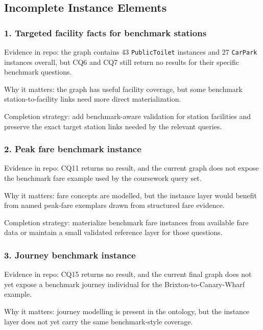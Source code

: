 \documentclass[
  11pt,
  a4paper,
]{article}
\begin{document}
\subsection{Incomplete Instance
Elements}\label{incomplete-instance-elements}

\subsubsection{1. Targeted facility facts for benchmark
stations}\label{1-targeted-facility-facts-for-benchmark-stations}

Evidence in repo: the graph contains 43 \texttt{PublicToilet} instances
and 27 \texttt{CarPark} instances overall, but CQ6 and CQ7 still return
no results for their specific benchmark questions.

Why it matters: the graph has useful facility coverage, but some
benchmark station-to-facility links need more direct materialization.

Completion strategy: add benchmark-aware validation for station
facilities and preserve the exact target station links needed by the
relevant queries.

\subsubsection{2. Peak fare benchmark
instance}\label{2-peak-fare-benchmark-instance}

Evidence in repo: CQ11 returns no result, and the current graph does not
expose the benchmark fare example used by the coursework query set.

Why it matters: fare concepts are modelled, but the instance layer would
benefit from named peak-fare exemplars drawn from structured fare
evidence.

Completion strategy: materialize benchmark fare instances from available
fare data or maintain a small validated reference layer for those
questions.

\subsubsection{3. Journey benchmark
instance}\label{3-journey-benchmark-instance}

Evidence in repo: CQ15 returns no result, and the current final graph
does not yet expose a benchmark journey individual for the
Brixton-to-Canary-Wharf example.

Why it matters: journey modelling is present in the ontology, but the
instance layer does not yet carry the same benchmark-style coverage.
\end{document}

